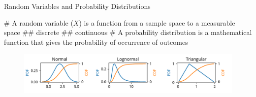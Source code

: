 \documentclass[12pt, aspectratio=149]{beamer}
\theoremstyle{plain}
\begin{document}
\begin{frame}[fragile]{Random Variables and Probability Distributions}

	\begin{easylist}[itemize]
		# A random variable ($X$) is a function from a sample space to a measurable space 
		## discrete
		## continuous
		# A probability distribution is a mathematical function that gives the probability of occurrence of outcomes
	\end{easylist}

	\begin{figure}
		\centering
		\includegraphics[width=0.99\linewidth]{figures/pdfs_cdfs}
	\end{figure}
\end{frame}
\end{document}
